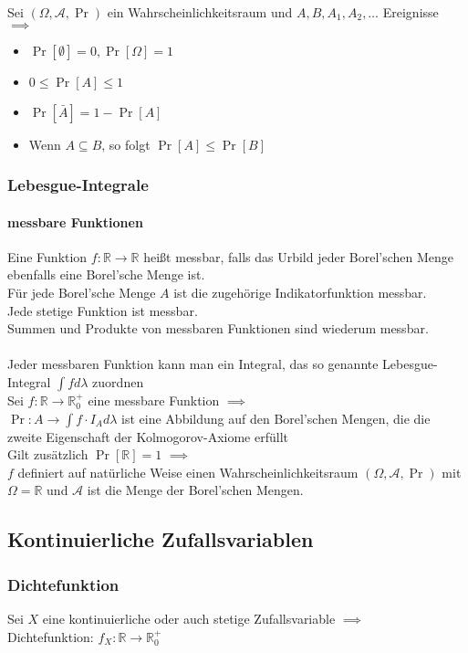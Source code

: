 \documentclass[a4paper,9pt]{extarticle}
\begin{document}
Sei $(\Omega, \mathcal{A}, \Pr)$ ein Wahrscheinlichkeitsraum und $A, B, A_1, A_2, \dots$ Ereignisse $\implies$
\begin{itemize}
	\item $\Pr[∅] = 0, \Pr[\Omega] = 1$
	\item $0 ≤ \Pr[A] ≤ 1$
	\item $\Pr[\bar{A}] = 1 - \Pr[A]$
	\item Wenn $A \subseteq B$, so folgt $\Pr[A] ≤ \Pr[B]$
\end{itemize}

\subsubsection*{Lebesgue-Integrale}
\paragraph*{messbare Funktionen}
Eine Funktion $f : \mathbb{R} → \mathbb{R}$ heißt messbar, falls das Urbild jeder Borel'schen Menge ebenfalls eine Borel'sche Menge ist. \\

Für jede Borel'sche Menge $A$ ist die zugehörige Indikatorfunktion messbar. \\
Jede stetige Funktion ist messbar. \\
Summen und Produkte von messbaren Funktionen sind wiederum messbar. \\
\\

Jeder messbaren Funktion kann man ein Integral, das so genannte Lebesgue-Integral $\int f d \lambda$ zuordnen \\

Sei $f : \mathbb{R} → \mathbb{R}_0^+$ eine messbare Funktion $\implies$ \\
$\Pr : A → \int f ⋅ I_A d \lambda$ ist eine Abbildung auf den Borel'schen Mengen, die die zweite Eigenschaft der Kolmogorov-Axiome erfüllt \\
Gilt zusätzlich $\Pr[\mathbb{R}] = 1$ $\implies$ \\
$f$ definiert auf natürliche Weise einen Wahrscheinlichkeitsraum $(\Omega, \mathcal{A}, \Pr)$ mit $\Omega = \mathbb{R}$ und $\mathcal{A}$ ist die Menge der Borel'schen Mengen.


\subsection*{Kontinuierliche Zufallsvariablen}
\subsubsection*{Dichtefunktion}
Sei $X$ eine kontinuierliche oder auch stetige Zufallsvariable $\implies$ \\
Dichtefunktion: $f_X : \mathbb{R} → \mathbb{R}_0^+$ \\
\end{document}
